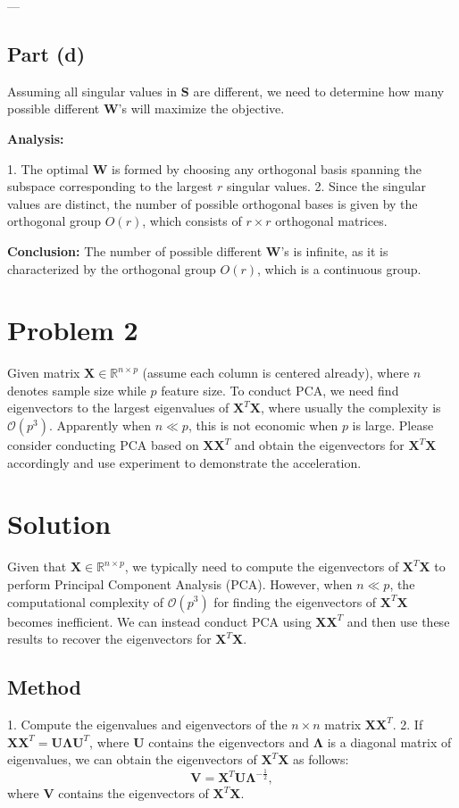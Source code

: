 \documentclass[11pt]{article}
\newcommand{\R}{\mathbb{R}}
\newcommand{\mtx}[1]{\mathbf{#1}}
\def \mS {\mtx{S}}
\def \mW {\mtx{W}}
\def \mX {\mtx{X}}
\def \R {\mathbb{R}}
\begin{document}
---

\subsection*{Part (d)}
Assuming all singular values in $\mS$ are different, we need to determine how many possible different $\bm{\mW}$'s will maximize the objective.

\textbf{Analysis:}

1. The optimal $\bm{\mW}$ is formed by choosing any orthogonal basis spanning the subspace corresponding to the largest $r$ singular values.
2. Since the singular values are distinct, the number of possible orthogonal bases is given by the orthogonal group $O(r)$, which consists of $r \times r$ orthogonal matrices.

\textbf{Conclusion:}
The number of possible different $\bm{\mW}$'s is infinite, as it is characterized by the orthogonal group $O(r)$, which is a continuous group.

\newpage

\section*{Problem 2}
	Given matrix $\mX\in\R^{n\times p}$ (assume each column is centered already), where $n$ denotes sample size while $p$ feature size. To conduct PCA, we need find eigenvectors to the  largest eigenvalues of $\mX^T\mX$, where usually the complexity is $\mathcal{O}(p^3)$. Apparently when $n\ll p$, this is not economic when $p$ is large. Please consider conducting PCA based on $\mX\mX^T$ and obtain the eigenvectors for $\mX^T\mX$ accordingly and use experiment to demonstrate the acceleration.

	\section*{Solution}

	Given that $\mathbf{X} \in \mathbb{R}^{n \times p}$, we typically need to compute the eigenvectors of $\mathbf{X}^T \mathbf{X}$ to perform Principal Component Analysis (PCA). However, when $n \ll p$, the computational complexity of $\mathcal{O}(p^3)$ for finding the eigenvectors of $\mathbf{X}^T \mathbf{X}$ becomes inefficient. We can instead conduct PCA using $\mathbf{X} \mathbf{X}^T$ and then use these results to recover the eigenvectors for $\mathbf{X}^T \mathbf{X}$.
	
	\subsection*{Method}
	1. Compute the eigenvalues and eigenvectors of the $n \times n$ matrix $\mathbf{X} \mathbf{X}^T$.
	2. If $\mathbf{X} \mathbf{X}^T = \mathbf{U} \mathbf{\Lambda} \mathbf{U}^T$, where $\mathbf{U}$ contains the eigenvectors and $\mathbf{\Lambda}$ is a diagonal matrix of eigenvalues, we can obtain the eigenvectors of $\mathbf{X}^T \mathbf{X}$ as follows:
	   \[
	   \mathbf{V} = \mathbf{X}^T \mathbf{U} \mathbf{\Lambda}^{-\frac{1}{2}},
	   \]
	   where $\mathbf{V}$ contains the eigenvectors of $\mathbf{X}^T \mathbf{X}$.
	
\end{document}
